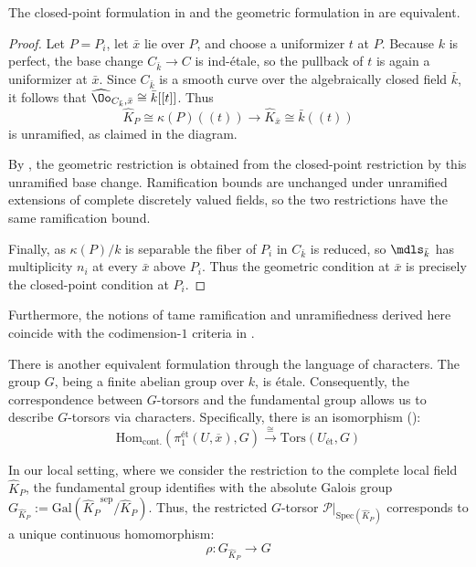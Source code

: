 \begin{prop}\label{prop:equivalence_ramification_bounded_by_modulus}
The closed-point formulation in
 and the geometric formulation in
 are equivalent.
\end{prop}

\begin{proof}
Let $P=P_i$, let $\bar{x}$ lie over $P$, and choose a uniformizer $t$ at $P$.
Because $k$ is perfect, the base change $C_{\bar{k}}\to C$ is ind-\'etale, so the pullback of $t$
is again a uniformizer at $\bar{x}$. Since $C_{\bar{k}}$ is a smooth curve over the algebraically
closed field $\bar{k}$, it follows that
$\widehat{\Oo}_{C_{\bar{k}},\bar{x}}\cong\bar{k}[[t]]$. Thus
\[
    \widehat{K}_P\cong\kappa(P)((t))
    \longrightarrow
    \widehat{K}_{\bar{x}}\cong\bar{k}((t))
\]
is unramified, as claimed in the diagram.

By , the geometric restriction is obtained from the
closed-point restriction by this unramified base change. Ramification bounds are unchanged under
unramified extensions of complete discretely valued fields, so the two restrictions have the same
ramification bound.

Finally, as $\kappa(P)/k$ is separable the fiber of $P_i$ in $C_{\bar{k}}$ is reduced, so
$\mdls_{\bar{k}}$ has multiplicity $n_i$ at every $\bar{x}$ above $P_i$. Thus the geometric
condition at $\bar{x}$ is precisely the closed-point condition at $P_i$.
\end{proof}

Furthermore,
the notions of tame ramification and unramifiedness derived here coincide with the codimension-$1$
criteria in .

There is another equivalent formulation through the language of characters.
The group $G$, being a finite abelian group over $k$, is \'etale.
Consequently, the correspondence between $G$-torsors and the fundamental group allows us to describe $G$-torsors
 via characters. Specifically, there is an isomorphism ():
\[ \mathrm{Hom}_{\mathrm{cont.}}(\pi_1^{\text{\'et}}(U, \overline{x}), G) \xrightarrow{\cong} \mathrm{Tors}(U_{\text{\'et}}, G) \]

In our local setting, where we consider the restriction to the complete local field $\widehat{K}_P$,
the fundamental group identifies with the absolute Galois group
$G_{\widehat{K}_P} := \mathrm{Gal}({\widehat{K}_P}^{\mathrm{sep}}/{\widehat{K}_P})$.
Thus, the restricted $G$-torsor $\mathcal{P}|_{\mathrm{Spec}(\widehat{K}_P)}$ corresponds to a unique continuous homomorphism:
\[ \rho : G_{\widehat{K}_P} \to G \]

